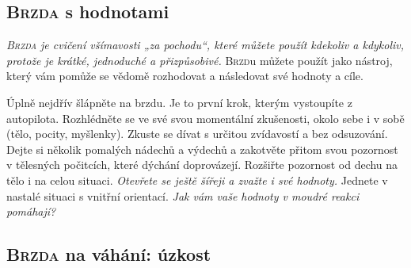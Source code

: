 	\vskip-2mm
	\subsection{\textsc{Brzda} s hodnotami}
		\vskip-2mm
		\emph{\textsc{Brzda} je cvičení všímavosti „za pochodu“, které můžete použít kdekoliv a kdykoliv, protože je krátké, jednoduché a přizpůsobivé.} \textsc{Brzd}u můžete použít jako nástroj, který vám pomůže se vědomě rozhodovat a následovat své hodnoty a cíle.
		\begin{itemize*}[leftmargin=10mm]
		 Úplně nejdřív šlápněte na brzdu. Je to první krok, kterým vystoupíte z autopilota.
		 Rozhlédněte se ve své svou momentální zkušenosti, okolo sebe i v sobě (tělo, pocity, myšlenky). Zkuste se dívat s určitou zvídavostí a bez odsuzování.
		 Dejte si několik pomalých nádechů a výdechů a zakotvěte přitom svou pozornost v tělesných počitcích, které dýchání doprovázejí. %
		 Rozšiřte pozornost od dechu na tělo i na celou situaci. \emph{Otevřete se ještě šířeji a zvažte i své hodnoty.}
		 Jednete v nastalé situaci s vnitřní orientací. \emph{Jak vám vaše hodnoty v moudré reakci pomáhají?}
		\end{itemize*}
	\vfill

	\subsection{\textsc{Brzda} na váhání: úzkost}
	\clearpage
